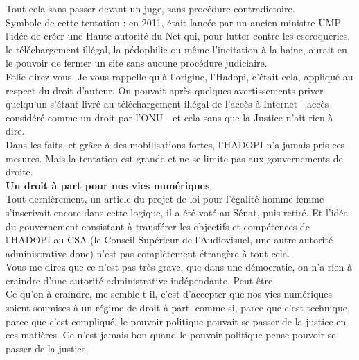 \documentclass[11pt,twoside,a4paper]{article}
\begin{document}
Tout cela sans passer devant un juge, sans proc{\'e}dure contradictoire. ~\\

Symbole de cette tentation : en 2011, {\'e}tait lanc{\'e}e par un ancien ministre UMP l'id{\'e}e de cr{\'e}er une Haute autorit{\'e} du Net qui, pour lutter contre les escroqueries, le t{\'e}l{\'e}chargement ill{\'e}gal, la p{\'e}dophilie ou m{\^e}me l'incitation {\`a} la haine, aurait eu le pouvoir de fermer un site sans aucune proc{\'e}dure judiciaire. ~\\

Folie direz-vous. Je vous rappelle qu'{\`a} l'origine, l'Hadopi, c'{\'e}tait cela, appliqu{\'e} au respect du droit d'auteur. On pouvait apr{\`e}s quelques avertissements priver quelqu'un s'{\'e}tant livr{\'e} au t{\'e}l{\'e}chargement ill{\'e}gal de l'acc{\`e}s {\`a} Internet - acc{\`e}s consid{\'e}r{\'e} comme un droit par l'ONU - et cela sans que la Justice n'ait rien {\`a} dire. ~\\

Dans les faits, et gr{\^a}ce {\`a} des mobilisations fortes, l'HADOPI n'a jamais pris ces mesures. Mais la tentation est grande et ne se limite pas aux gouvernements de droite. ~\\

\textbf{\large Un droit {\`a} part pour nos vies num{\'e}riques}~\\

Tout derni{\`e}rement, un article du projet de loi pour l'{\'e}galit{\'e} homme-femme s'inscrivait encore dans cette logique, il a {\'e}t{\'e} vot{\'e} au S{\'e}nat, puis retir{\'e}. Et l'id{\'e}e du gouvernement consistant {\`a} transf{\'e}rer les objectifs et comp{\'e}tences de l'HADOPI au CSA (le Conseil Sup{\'e}rieur de l'Audiovisuel, une autre autorit{\'e} administrative donc) n'est pas compl{\`e}tement {\'e}trang{\`e}re {\`a} tout cela. ~\\

Vous me direz que ce n'est pas tr{\`e}s grave, que dans une d{\'e}mocratie, on n'a rien {\`a} craindre d'une autorit{\'e} administrative ind{\'e}pendante. Peut-{\^e}tre. ~\\

Ce qu'on {\`a} craindre, me semble-t-il, c'est d'accepter que nos vies num{\'e}riques soient soumises {\`a} un r{\'e}gime de droit {\`a} part, comme si, parce que c'est technique, parce que c'est compliqu{\'e}, le pouvoir politique pouvait se passer de la justice en ces mati{\`e}res. Ce n'est jamais bon quand le pouvoir politique pense pouvoir se passer de la justice. ~\\
\end{document}
